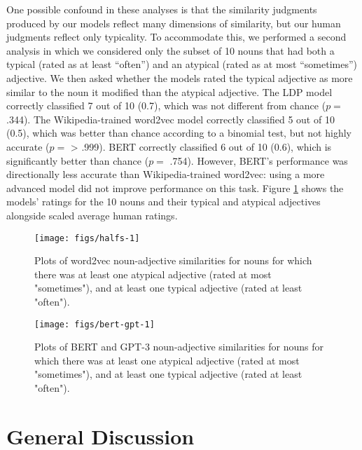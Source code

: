 \documentclass{ucetd}
\begin{document}
One possible confound in these analyses is that the similarity judgments
produced by our models reflect many dimensions of similarity, but our
human judgments reflect only typicality. To accommodate this, we
performed a second analysis in which we considered only the subset of 10
nouns that had both a typical (rated as at least ``often'') and an
atypical (rated as at most ``sometimes'') adjective. We then asked
whether the models rated the typical adjective as more similar to the
noun it modified than the atypical adjective. The LDP model correctly
classified 7 out of 10 (0.7), which was not different from chance
(\(p =\) .344). The Wikipedia-trained word2vec model correctly
classified 5 out of 10 (0.5), which was better than chance according to
a binomial test, but not highly accurate (\(p =\) \textgreater{} .999).
BERT correctly classified 6 out of 10 (0.6), which is significantly
better than chance (\(p =\) .754). However, BERT's performance was
directionally less accurate than Wikipedia-trained word2vec: using a
more advanced model did not improve performance on this task. Figure
\ref{fig:halfs} shows the models' ratings for the 10 nouns and their
typical and atypical adjectives alongside scaled average human ratings.

\begin{figure}[!tb]

{\centering \texttt{[image: figs/halfs-1]} 

}

\caption{Plots of word2vec noun-adjective similarities for nouns for which there was at least one atypical adjective (rated at most "sometimes"), and at least one typical adjective (rated at least "often").}\label{fig:halfs}
\end{figure}

\begin{figure}[!tb]

{\centering \texttt{[image: figs/bert-gpt-1]} 

}

\caption{Plots of BERT and GPT-3 noun-adjective similarities for nouns for which there was at least one atypical adjective (rated at most "sometimes"), and at least one typical adjective (rated at least "often").}\label{fig:bert-gpt}
\end{figure}

\hypertarget{general-discussion}{%
\section{General Discussion}\label{general-discussion}}
\end{document}
